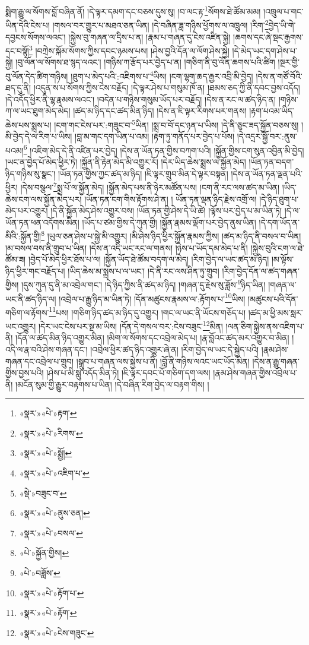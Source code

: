 སྨིག་རྒྱུ་ལ་སོགས་བློ་བཞིན་ནོ། །དེ་ལྟར་དམག་དང་བཅས་དུས་སུ། །བ་ལང་རྟ་\footnote{«སྣར་»«པེ་»རྟག་}སོགས་ཐེ་ཚོམ་མམ། །འཁྲུལ་པ་གང་ཡིན་དེའི་ངེས་པ། །གསལ་བར་གྱུར་པ་མཐའ་ཅན་ཡིན། །དེ་བཞིན་ཟླ་གཉིས་ཕྱོགས་ལ་འཁྲུལ། །རིག་\footnote{«སྣར་»«པེ་»རིགས་}བྱེད་ཡི་གེ་དབྱངས་སོགས་ལའང་། །སྐྱེས་བུ་གཞན་ལ་དྲིས་པ་ན། །རྣམ་པ་གཞན་དུ་ངེས་འཛིན་སྐྱེ། །ཆགས་དང་ཞེ་སྡང་རྒྱགས་དང་བསྙོ།\footnote{«སྣར་»«པེ་»སྨྱོ།} །བཀྲེས་སྐོམ་སོགས་ཀྱིས་དབང་ཉམས་པས། །ཤེས་བྱའི་དོན་ལ་ལོག་ཤེས་སྐྱེ། །དེ་མེད་ཡང་དག་ཤེས་པ་སྐྱེ། །བུ་ལོན་ལ་སོགས་ཐ་སྙད་ལའང་། །གཉིས་ཀ་རྩོད་པར་བྱེད་པ་ན། །གཅིག་ནི་བུ་ལོན་ཆགས་པའི་ཚིག །སྔར་གྱི་བུ་ལོན་དེད་ཚིག་གཉིས། །ཐུག་པ་མེད་པའི་:འཇིགས་པ་\footnote{«སྣར་»«པེ་»འཇིག་པ་}ཡིས། །ངག་ལྷག་ཆད་རྒྱར་འབྲི་མི་བྱེད། །དེས་ན་གཙོ་བོའི་ཐད་དུ་ནི། །འདུན་ས་པ་སོགས་ཀྱིས་ངེས་བརྗོད། །དེ་ལྟར་ཤེས་པ་གསུམ་ཁོ་ན། །ཐམས་ཅད་ཀྱི་ནི་དབང་བྱས་འདོད། །དེ་འདོད་ཕྱིར་ནི་ལྷ་རྣམས་ལའང་། །བདེན་པ་གཉིས་གསུམ་ཡོད་པར་བརྗོད། །དེས་ན་རང་ལ་ཚད་ཉིད་ན། །གཉིས་ཀ་ལ་ཡང་ཐུག་མེད་མེད། །ཚད་མ་ཉིད་དང་ཚད་མིན་ཉིད། །དེས་ན་ཇི་ལྟར་རིགས་པར་གནས། །རྟག་པའམ་ཡིད་ཆེས་པས་སྨྲས་པ། །ངག་གང་ངེས་པར་:གཟུང་བ་\footnote{«སྡེ་»བཟུང་བ་}ཡིན། །སྨྲ་བ་བོ་དང་ཉན་པ་ཡིས། །དེ་ནི་ཅུང་ཟད་སྐྱོན་བཅས་སུ། །མི་བྱེད་དེ་ལ་རིག་པ་ཡིས། །བླ་མ་གང་དག་ཡིན་པ་འམ། །རྟག་ཏུ་གནོད་པར་བྱེད་པ་པོས། །དེ་འདྲར་སྐྱོ་བར་:ནུས་པའམ།\footnote{«སྣར་»«པེ་»ནུས་ཅན།} །འཇིག་མེད་དེ་ནི་འཛིན་པར་བྱེད། །དེས་ན་ཡོན་ཏན་གྱིས་བཀག་པའི། །སྐྱོན་གྱིས་ངག་སུན་འབྱིན་མི་བྱེད། །ཡང་ན་བྱེད་པོ་མེད་ཕྱིར་ཏེ། །སྐྱོན་ནི་རྟེན་མེད་མི་འགྱུར་རོ། །དེར་ཡིད་ཆེས་སྨྲས་ལ་སྐྱོན་མེད། །ཡོན་ཏན་བདག་ཉིད་གཉིས་སུ་སྣང་། །ཡོན་ཏན་གྱིས་ཀྱང་ཚད་མ་ཉིད། །ཇི་ལྟར་གྲུབ་མིན་དེ་ལྟར་བསྟན། །དེས་ན་ཡོན་ཏན་ལྡན་པའི་ཕྱིར། །དེས་བསྩལ་\footnote{«སྣར་»«པེ་»བསལ་}སྨྲ་པོ་ལ་སྐྱོན་མེད། །སྐྱོན་མེད་པས་ནི་ཉེར་མཚོན་པས། །ངག་ནི་རང་ལས་ཚད་མ་ཡིན། །ཡིད་ཆེས་ངག་ལས་སྐྱོན་མེད་པར། །ཡོན་ཏན་ངག་གིས་རྟོགས་ཤེ་ན། །
ཡོན་ཏན་ལྡན་ཉིད་རྗེས་འགྲོ་ལ། །དེ་ཉིད་ཐུག་པ་མེད་པར་འགྱུར། །དེ་ནི་སྐྱོན་མེད་ཤེས་འགྱུར་བས། །ཡོན་ཏན་གྱི་ཤེས་དེ་ཡི་ཚེ། །ལྟོས་པར་བྱེད་པ་མ་ཡིན་ཏེ། །དེ་ལ་ཡོན་ཏན་ཕན་འདོགས་མིན། །ཡོད་པ་ཙམ་གྱིས་དེ་ཀུན་གྱི། །སྐྱོན་རྣམས་ལྡོག་པར་བྱེད་ནུས་ཡིན། །དེ་དག་ཡོད་ན་མིའི་:སྐྱོན་གྱི།\footnote{«པེ་»སྐྱོན་གྱིས།} །ཡུལ་ཅན་ཤེས་པ་སྐྱེ་མི་འགྱུར། །མི་ཤེས་ཉིད་ཕྱིར་སྐྱོན་རྣམས་ཀྱིས། །ཚད་མ་ཉིད་ནི་བསལ་བ་ཡིན། །མ་བསལ་བས་ནི་གྲུབ་པ་ཡིན། །དེས་ན་འདི་ཡང་རང་ལ་གནས། །ཉེས་པ་ཡོད་དམ་མེད་པ་ནི། །སྐྱེས་བུའི་ངག་ལ་ཐེ་ཚོམ་ཟ། །བྱེད་པོ་མེད་ཕྱིར་ཐོས་པ་ལ། །སྐྱོན་ཡོད་ཐེ་ཚོམ་བདག་ལ་མེད། །རིག་བྱེད་ལ་ཡང་ཚད་མ་ཉིད། །མ་ལྟོས་ཉིད་ཕྱིར་གང་བརྗོད་པ། །ཡིད་ཆེས་མ་སྨྲས་པ་ལ་ཡང་། །དེ་ནི་རང་ལས་ཤིན་ཏུ་གྲུབ། །རིག་བྱེད་དོན་ལ་ཚད་གཞན་གྱིས། །དུས་ཀུན་དུ་ནི་མ་འབྲེལ་གང་། །དེ་ཉིད་ཀྱིས་ནི་ཚད་མ་ཉིད། །གཞན་དུ་རྗེས་སུ་ཟློས་\footnote{«པེ་»བཟློས་}ཉིད་ཡིན། །གཞན་ལ་ཡང་ནི་ཚད་ཉིད་ལ། །འབྲེལ་པ་རྒྱུ་ཉིད་མ་ཡིན་ཏེ། །དོན་མཚུངས་རྣམས་ལ་:རྟོགས་པ་\footnote{«སྣར་»«པེ་»རྟོག་པ་}ཡིས། །མཚུངས་པའི་དོན་གཅིག་ལ་རྟོགས་\footnote{«སྣར་»«པེ་»རྟོག་}པས། །གཅིག་ཉིད་ཚད་མ་ཉིད་དུ་འགྱུར། །གང་ལ་ཡང་ནི་ཡོངས་གཅོད་པ། །ཚད་མ་ཕྱི་མས་སླར་ཡང་འགྱུར། །དེར་ཡང་ངེས་པར་སྔ་མ་ཡིས། །དོན་དེ་གསལ་བར་:ངེས་བཟུང་\footnote{«སྣར་»«པེ་»ངེས་གཟུང་}མིན། །ལན་ཅིག་སྐྱེས་ནས་འཇིག་པ་ནི། །དོན་ལ་ཚད་མིན་ཉིད་འགྱུར་མིན། །མིག་ལ་སོགས་དང་འབྲེལ་མེད་པ། །རྣ་བློའང་ཚད་མར་འགྱུར་བ་མིན། །འདི་ལ་རྣ་བའི་ཤེས་གཞན་དང་། །འབྲེལ་ཕྱིར་ཚད་ཉིད་འགྱུར་ཞེ་ན། །རིག་བྱེད་ལ་ཡང་དེ་སྐྱེད་པའི། །རྣམ་ཤེས་གཞན་དང་འབྲེལ་པ་གྲུབ། །སྒྲུབ་པ་གཞན་ལས་སྐྱེས་པ་ནི། །བློ་ནི་གཉིས་ལའང་ཡང་ཡོད་མིན། །དེས་ན་རྒྱུ་གཞན་གྱིས་བྱས་པའི། །ཤེས་པ་མི་སླུ་འདོད་མིན་ཏེ། །ཇི་ལྟར་དབང་པོ་གཅིག་དག་ལས། །རྣམ་ཤེས་གཞན་གྱིས་འབྲེལ་པ་ནི། །མངོན་སུམ་གྱི་རྒྱུར་བརྟགས་པ་ཡིན། །དེ་བཞིན་རིག་བྱེད་ལ་བརྟག་གིས། །
